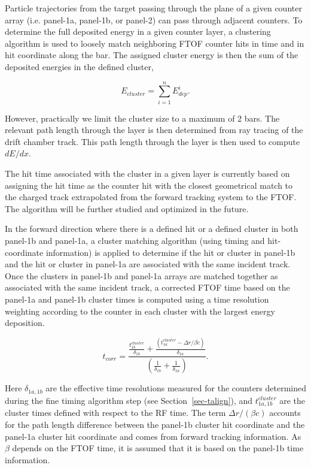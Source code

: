 \documentclass[final,3p,twocolumn]{elsarticle}
\begin{document}
Particle trajectories from the target passing through the plane of a given counter array (i.e. panel-1a, panel-1b,
or panel-2) can pass through adjacent counters. To determine the full deposited energy in a given counter layer,
a clustering algorithm is used to loosely match neighboring FTOF counter hits in time and in hit coordinate along
the bar. The assigned cluster energy is then the sum of the deposited energies in the defined cluster,

\begin{equation}
  E_{cluster} = \sum_{i=1}^{n} E_{dep}^i.
\end{equation}

\noindent
However, practically we limit the cluster size to a maximum of 2 bars. The relevant path length through the
layer is then determined from ray tracing of the drift chamber track. This path length through the layer is
then used to compute $dE/dx$.

The hit time associated with the cluster in a given layer is currently based on assigning the hit time as
the counter hit with the closest geometrical match to the charged track extrapolated from the forward
tracking system to the FTOF. The algorithm will be further studied and optimized in the future.

In the forward direction where there is a defined hit or a defined cluster in both panel-1b and panel-1a,
a cluster matching algorithm (using timing and hit-coordinate information) is applied to determine if the
hit or cluster in panel-1b and the hit or cluster in panel-1a are associated with the same incident track.
Once the clusters in panel-1b and panel-1a arrays are matched together as associated with the same
incident track, a corrected FTOF time based on the panel-1a and panel-1b cluster times is computed using
a time resolution weighting according to the counter in each cluster with the largest energy deposition.

\begin{equation}
  t_{corr} = \frac{\displaystyle \frac{\displaystyle t_{1b}^{cluster}}{\displaystyle \delta_{1b}} +
    \frac{\displaystyle (t_{1a}^{cluster} - \Delta r/\beta c)}{\displaystyle \delta_{1a}}}
  {\displaystyle \left( \frac{\displaystyle 1}{\displaystyle \delta_{1b}} +
    \frac{\displaystyle 1}{\displaystyle \delta_{1a}} \right)}.
\end{equation}

\noindent
Here $\delta_{1a,1b}$ are the effective time resolutions measured for the counters determined during
the fine timing algorithm step (see Section~\ref{sec-talign}), and $t_{1a,1b}^{cluster}$ are the cluster
times defined with respect to the RF time. The term $\Delta r/(\beta c)$ accounts for the path length
difference between the panel-1b cluster hit coordinate and the panel-1a cluster hit coordinate and comes
from forward tracking information. As $\beta$ depends on the FTOF time, it is assumed that it is based
on the panel-1b time information.
\end{document}
